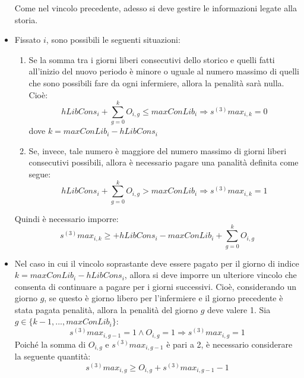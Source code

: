 \begin{itemize}
Come nel vincolo precedente, adesso si deve gestire le informazioni legate alla storia.

\item Fissato $i$, sono possibili le seguenti situazioni:
\begin{enumerate}
\item Se la somma tra i giorni liberi consecutivi dello storico e quelli fatti all'inizio del nuovo periodo è minore o uguale al numero massimo di quelli che sono possibili fare da ogni infermiere, allora la penalità sarà nulla. Cioè:
\begin{equation}
hLibCons_i + \sum_{g=0}^k O_{i, g} \leq maxConLib_i \Longrightarrow s^{(3)}max_{i, k} = 0
\end{equation}
dove $k = maxConLib_i - hLibCons_i$

\item Se, invece, tale numero è maggiore del numero massimo di giorni liberi consecutivi possibili, allora è necessario pagare una panalità definita come segue:
\begin{equation}
hLibCons_i + \sum_{g=0}^k O_{i, g} > maxConLib_i \Longrightarrow s^{(3)}max_{i, k} = 1
\end{equation}
\end{enumerate}
Quindi è necessario imporre:
\begin{equation}
s^{(3)}max_{i, k} \geq + hLibCons_i - maxConLib_i + \sum_{g=0}^k O_{i, g}
\end{equation}

\item Nel caso in cui il vincolo soprastante deve essere pagato per il giorno di indice $k = maxConLib_i - hLibCons_i$, allora si deve imporre un ulteriore vincolo che consenta di continuare a pagare per i giorni successivi.
Cioè, considerando un giorno $g$, se questo è giorno libero per l'infermiere e il giorno precedente è stata pagata penalità, allora la penalità del giorno $g$ deve valere 1. Sia $g \in \{k - 1,...,maxConLib_i\}$:
\begin{equation}
s^{(3)}max_{i, g-1} = 1 \wedge O_{i, g} = 1 \Longrightarrow s^{(3)}max_{i, g} = 1
\end{equation}
Poiché la somma di $O_{i, g}$ e $s^{(3)}max_{i, g-1}$ è pari a 2, è necessario considerare la seguente quantità:
\begin{equation}
s^{(3)}max_{i, g} \geq O_{i, g} + s^{(3)}max_{i, g-1} - 1
\end{equation}
\end{itemize}

